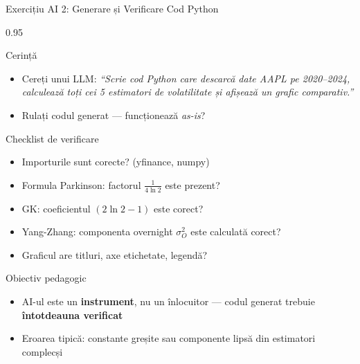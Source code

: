 \documentclass[9pt, aspectratio=169, t]{beamer}
\begin{document}
\begin{frame}[shrink=10]{Exercițiu AI 2: Generare și Verificare Cod Python}
\begin{cminipage}{0.95\textwidth}
    \begin{block}{Cerință}
    \begin{itemize}\setlength{\itemsep}{0pt}
        \item Cereți unui LLM: \textit{``Scrie cod Python care descarcă date AAPL pe 2020--2024, calculează toți cei 5 estimatori de volatilitate și afișează un grafic comparativ.''}
        \item Rulați codul generat --- funcționează \textit{as-is}?
    \end{itemize}
    \end{block}
    \vspace{0.1cm}
    \begin{alertblock}{Checklist de verificare}
    \begin{itemize}\setlength{\itemsep}{0pt}
        \item Importurile sunt corecte? (yfinance, numpy)
        \item Formula Parkinson: factorul $\frac{1}{4\ln 2}$ este prezent?
        \item GK: coeficientul $(2\ln 2 - 1)$ este corect?
        \item Yang-Zhang: componenta overnight $\sigma_O^2$ este calculată corect?
        \item Graficul are titluri, axe etichetate, legendă?
    \end{itemize}
    \end{alertblock}
    \vspace{0.1cm}
    \begin{exampleblock}{Obiectiv pedagogic}
    \begin{itemize}\setlength{\itemsep}{0pt}
        \item AI-ul este un \textbf{instrument}, nu un înlocuitor --- codul generat trebuie \textbf{întotdeauna verificat}
        \item Eroarea tipică: constante greșite sau componente lipsă din estimatori complecși
    \end{itemize}
    \end{exampleblock}
\end{cminipage}
\end{frame}

\end{document}
